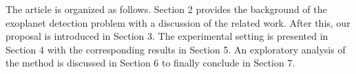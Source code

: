 The article is organized as follows. Section 2 provides the background of the exoplanet detection problem with a discussion of the related work. After this, our proposal is introduced in Section 3. The experimental setting is presented in Section 4 with the corresponding results in Section 5.
An exploratory analysis of the method is discussed in Section 6 to finally conclude in Section 7.






